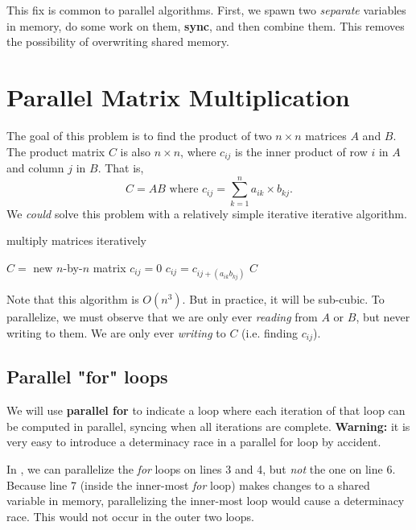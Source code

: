 \documentclass[titlepage, 12pt, leqno]{article}
\begin{document}
This fix is common to parallel algorithms. First, we spawn two \textit{separate}
variables in memory, do some work on them, \textbf{sync}, and then combine them.
This removes the possibility of overwriting shared memory.

\pagebreak
\section{Parallel Matrix Multiplication}

The goal of this problem is to find the product of two $n\times n$ matrices
$A$ and $B$. The product matrix $C$ is also $n\times n$, where $c_{ij}$ is the
inner product of row $i$ in $A$ and column $j$ in $B$. That is,
\[
    C = AB \text{ where } c_{ij} = \sum_{k=1}^{n} a_{ik} \times b_{kj}.
\]
We \textit{could} solve this problem with a relatively simple iterative
iterative algorithm.
\begin{algorithm}
\caption{multiply matrices iteratively}
\begin{algorithmic}[1]
    \State $C = $ new $n$-by-$n$ matrix
            \State $c_{ij} = 0$
                \State $c_{ij } = c_{ij + (a_{ik}b_{kj})}$
            \EndFor
        \EndFor
    \EndFor
    \State \Return $C$
\EndProcedure 
\end{algorithmic}
\end{algorithm}

Note that this algorithm is $O(n^{3})$. But in practice, it will be sub-cubic.
To parallelize, we must observe that we are only ever \textit{reading} from
$A$ or $B$, but never writing to them. We are only ever \textit{writing} to
$C$ (i.e. finding $c_{ij}$).

\subsection{Parallel "for" loops}
We will use \textbf{parallel for} to indicate a loop where each iteration of
that loop can be computed in parallel, syncing when all iterations are complete.
\textbf{Warning:} it is very easy to introduce a determinacy race in a 
parallel for loop by accident.

In , we can parallelize the \textit{for} loops on lines 3 and
4, but \textit{not} the one on line 6. Because line 7 (inside the inner-most
\textit{for} loop) makes changes to a shared variable in memory, parallelizing
the inner-most loop would cause a determinacy race. This would not occur in the
outer two loops.
\end{document}
